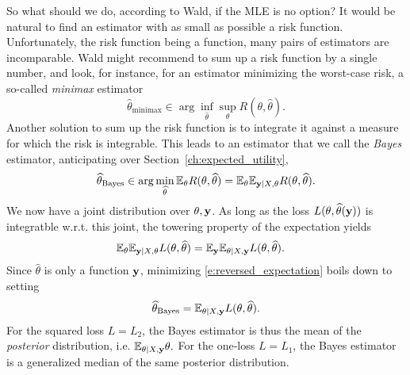 So what should we do, according to Wald, if the MLE is no option? 
It would be natural to find an estimator with as small as possible a risk function.
Unfortunately, the risk function being a function, many pairs of estimators are incomparable. 
Wald might recommend to sum up a risk function by a single number, and look, for instance, for an estimator minimizing the worst-case risk, a so-called \emph{minimax} estimator
\begin{equation}
    \widehat\theta_{\text{minimax}} \in \arg\inf_{\widehat{\theta}} \sup_\theta R(\theta,\widehat{\theta}).
    \label{e:minimax_estimator_for_regression}
\end{equation}
Another solution to sum up the risk function is to integrate it against a measure for which the risk is integrable. 
This leads to an estimator that we call the \emph{Bayes} estimator, anticipating over Section~\ref{ch:expected_utility},
\begin{equation}
    \widehat{\theta}_{\text{Bayes}} \in \arg\min_{\widehat{\theta}} \mathbb{E}_\theta R(\theta,\widehat{\theta}) = \mathbb{E}_\theta \mathbb{E}_{\mathbf{y}\vert X,\theta} R(\theta,\widehat{\theta}).
    \label{e:bayes_estimator_for_regression}
\end{equation}
We now have a joint distribution over $\theta,\mathbf{y}$. 
As long as the loss $L(\theta,\widehat{\theta}(\mathbf{y}))$ is integratble w.r.t. this joint, the towering property of the expectation yields
\begin{align}
    \mathbb{E}_\theta \mathbb{E}_{\mathbf{y}\vert X,\theta} L(\theta,\widehat{\theta}) 
    &= \mathbb{E}_{\mathbf{y}} \mathbb{E}_{\theta\vert X,\mathbf{y}} L(\theta,\widehat{\theta}).
\label{e:reversed_expectation}
\end{align}
Since $\widehat{\theta}$ is only a function $\mathbf{y}$, minimizing \eqref{e:reversed_expectation} boils down to setting 
$$
\widehat{\theta}_{\text{Bayes}} = \mathbb{E}_{\theta\vert X,\mathbf{y}} L(\theta,\widehat{\theta}).
$$
For the squared loss $L=L_2$, the Bayes estimator is thus the mean of the \emph{posterior} distribution, i.e. 
$
\mathbb{E}_{\theta\vert X,\mathbf{y}} \theta. 
$
For the one-loss $L=L_1$, the Bayes estimator is a generalized median of the same posterior distribution.